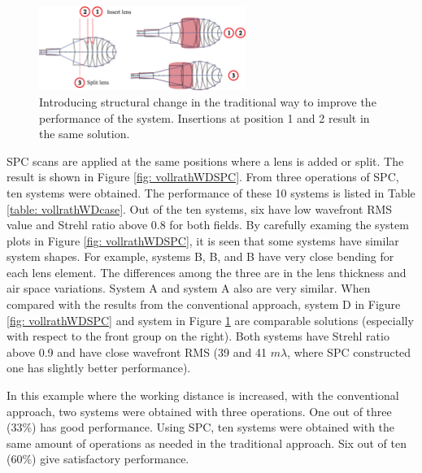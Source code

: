 \newpage %

\begin{figure}[h!]
    \centering
    \includegraphics[width=0.6\textwidth]{chapter-4/figures/vollrathWDTrad.png}
    \caption{Introducing structural change in the traditional way to improve the performance of the system. Insertions at position \textcircled{\scriptsize{1}} and \textcircled{\scriptsize{2}} result in the same solution. }
    \label{fig: vollrathWDTrad}
\end{figure}
SPC scans are applied at the same positions where a lens is added or split. The result is shown in Figure \ref{fig: vollrathWDSPC}. From three operations of SPC, ten systems were obtained. The performance of these 10 systems is listed in Table \ref{table: vollrathWDcase}. Out of the ten systems, six have low wavefront RMS value and Strehl ratio above 0.8 for both fields. By carefully examing the system plots in Figure \ref{fig: vollrathWDSPC}, it is seen that some systems have similar system shapes. For example, systems B, B, and B have very close bending for each lens element. The differences among the three are in the lens thickness and air space variations. System A and system A also are very similar. When compared with the results from the conventional approach, system D in Figure \ref{fig: vollrathWDSPC} and system  in Figure \ref{fig: vollrathWDTrad} are comparable solutions (especially with respect to the front group on the right). Both systems have Strehl ratio above 0.9 and have close wavefront RMS (39 and 41 $m\lambda$, where SPC constructed one has slightly better performance).

In this example where the working distance is increased, with the conventional approach, two systems were obtained with three operations. One out of three (33\%) has good performance. Using SPC, ten systems were obtained with the same amount of operations as needed in the traditional approach. Six out of ten (60\%) give satisfactory performance. 

